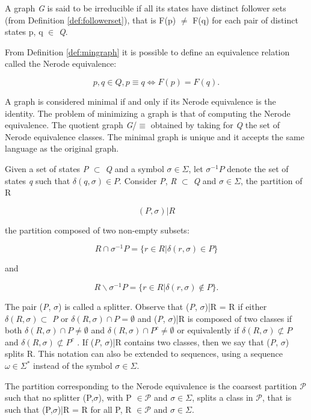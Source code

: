 {\begin{definition}\label{def:mingraph}
A graph \textit{G} is said to be irreducible if all its states have distinct follower sets (from Definition \ref{def:followerset}), that is F(p) $\neq$ F(q) for each pair of distinct states p, q $\in$ \textit{Q}.
\end{definition}

From Definition \ref{def:mingraph} it is possible to define an equivalence relation called the Nerode equivalence:

\[
p, q \in Q, p \equiv q \Leftrightarrow F(p) = F(q).
\]

A graph is considered minimal if and only if its Nerode equivalence is the identity. The problem of minimizing a graph is that of computing the Nerode equivalence. The quotient graph \textit{G}/$\equiv$ obtained by taking for \textit{Q} the set of Nerode equivalence classes. The minimal graph is unique and it accepts the same language as the original graph.

Given a set of states \textit{P} $\subset$  \textit{Q} and a symbol $\sigma \in \Sigma$, let $\sigma^{-1}\textit{P}$ denote the set of states \textit{q} such that $\delta(q, \sigma) \in P$. Consider \textit{P}, \textit{R} $\subset$ \textit{Q} and $\sigma \in \Sigma$, the partition of R

\[
(P, \sigma)|R
\]

\noindent the partition composed of two non-empty subsets:

\[
R\cap\sigma^{-1}P = \{r \in R | \delta(r,\sigma) \in P\}
\]

\noindent and

\[
R\backslash\sigma^{-1}P = \{r \in R | \delta(r,\sigma) \notin P\}.
\]

The pair (\textit{P}, $\sigma$) is called a splitter. Observe that (\textit{P}, $\sigma$)|R = {R} if either $\delta(R,\sigma) \subset$ \textit{P}
or $\delta(R,\sigma)\cap P = \emptyset$ and (\textit{P}, $\sigma$)|R is composed of two classes if both $\delta(R,\sigma)\cap P  \neq\emptyset$ and
$\delta(R,\sigma)\cap P^c  \neq \emptyset$  or equivalently if $\delta(R,\sigma) \not\subset P $   and  $\delta(R,\sigma)\not\subset P^c $ . If (\textit{P}, $\sigma$)|R  contains two
classes, then we say that (\textit{P}, $\sigma$) splits R. This notation can also be extended to sequences, using a sequence $\omega \in \Sigma^*$ instead of the symbol $\sigma \in \Sigma$.

\begin{proposition}\label{prop:nerequiv}
The partition corresponding to the Nerode equivalence is the coarsest partition $\mathcal{P}$ such that no splitter (P,$\sigma$), with P $\in \mathcal{P}$ and $\sigma \in \Sigma$, splits a class in $\mathcal{P}$, that is such that (P,$\sigma$)|R = {R} for all P, R $\in \mathcal{P}$ and $\sigma \in \Sigma$.
\end{proposition}

}
